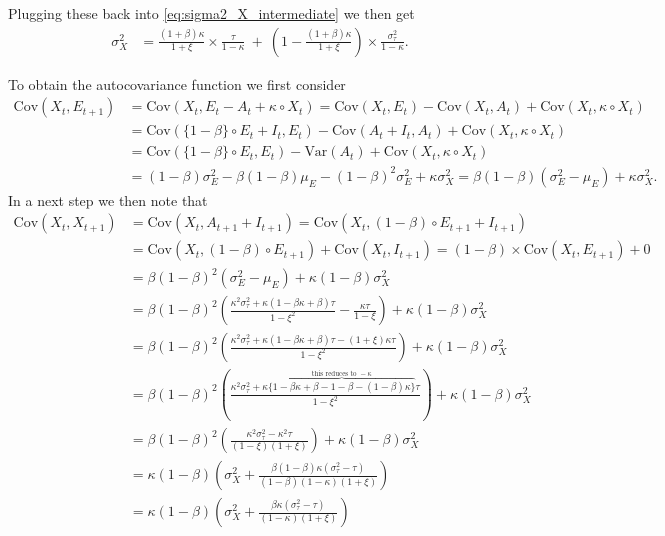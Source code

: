 \documentclass{article}
\begin{document}
Plugging these back into \eqref{eq:sigma2_X_intermediate} we then get
\begin{align}
\sigma^2_X & = \frac{(1 + \beta)\kappa}{1 + \xi} \times \frac{\tau}{1 - \kappa} \ + \ \left(1 - \frac{(1 + \beta)\kappa}{1 + \xi}\right) \times \frac{\sigma^2_\tau}{1 - \kappa}.
\end{align}

To obtain the autocovariance function we first consider
\begin{align}
\text{Cov}(X_t, E_{t + 1}) & = \text{Cov}(X_t, E_t - A_t + \kappa \circ X_t) = \text{Cov}(X_t, E_t) - \text{Cov}(X_t, A_t) + \text{Cov}(X_t, \kappa\circ X_t)\nonumber\\
& = \text{Cov}(\{1 - \beta\} \circ E_t + I_t, E_t) - \text{Cov}(A_t + I_t, A_t) + \text{Cov}(X_t, \kappa\circ X_t) \nonumber\\
& = \text{Cov}(\{1 - \beta\} \circ E_t, E_t) - \text{Var}(A_t) + \text{Cov}(X_t, \kappa\circ X_t) \nonumber \\
& = (1 - \beta) \sigma^2_E - \beta(1 - \beta)\mu_E - (1 - \beta)^2\sigma^2_E + \kappa\sigma^2_X = \beta(1 - \beta)(\sigma^2_E - \mu_E) + \kappa\sigma^2_X.\label{eq:acov1_intermediate}
\end{align}
In a next step we then note that
\begin{align*}
\text{Cov}(X_t, X_{t + 1}) & = \text{Cov}(X_t, A_{t + 1} + I_{t + 1}) = \text{Cov}(X_t, (1 - \beta) \circ E_{t + 1} + I_{t + 1})\\
& = \text{Cov}(X_t, (1 - \beta) \circ E_{t + 1}) + \text{Cov}(X_t, I_{t + 1}) = (1 - \beta) \times \text{Cov}(X_t, E_{t + 1}) + 0\\
& = \beta(1 - \beta)^2(\sigma^2_E - \mu_E) + \kappa(1 - \beta)\sigma^2_X\\
& = \beta(1 - \beta)^2\left(
\frac{\kappa^2\sigma^2_\tau + \kappa(1 - \beta\kappa + \beta)\tau}{1 - \xi^2} - \frac{\kappa\tau}{1 - \xi}
\right) + \kappa(1 - \beta)\sigma^2_X\\
& = \beta(1 - \beta)^2\left(
\frac{\kappa^2\sigma^2_\tau + \kappa(1 - \beta\kappa + \beta)\tau - (1 + \xi)\kappa\tau}{1 - \xi^2}
\right) + \kappa(1 - \beta)\sigma^2_X\\
& = \beta(1 - \beta)^2\left(
\frac{\kappa^2\sigma^2_\tau + \kappa\overbrace{\{1 - \beta\kappa + \beta - 1 - \beta - (1 - \beta)\kappa\}}^{\text{this reduces to }-\kappa}\tau}{1 - \xi^2}
\right) + \kappa(1 - \beta)\sigma^2_X\\
& = \beta(1 - \beta)^2\left(
\frac{\kappa^2\sigma^2_\tau - \kappa^2\tau}{(1 - \xi)(1 + \xi)}
\right) + \kappa(1 - \beta)\sigma^2_X\\
& = \kappa(1 - \beta)\left(\sigma^2_X + 
\frac{\beta(1 - \beta)\kappa(\sigma^2_\tau - \tau)}{(1 - \beta)(1 - \kappa)(1 + \xi)}
\right)\\
& = \kappa(1 - \beta)\left(\sigma^2_X + 
\frac{\beta\kappa(\sigma^2_\tau - \tau)}{(1 - \kappa)(1 + \xi)}
\right)\\
\end{align*}
\end{document}
